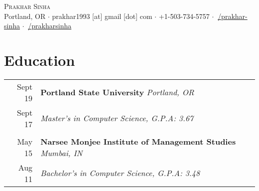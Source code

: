 \documentclass[article,10pt]{article}
\begin{document}
\pagestyle{empty} %

\begin{center}
	{\Huge \scshape {Prakhar Sinha}}\\
	Portland, OR $\cdot$ prakhar1993 [at] gmail [dot] com $\cdot$ +1-503-734-5757 $\cdot$ \href{https://linkedin.com/in/prakhar-sinha/}{\faLinkedinSquare $\:$/prakhar-sinha}  $\cdot$ \href{https://github.com/prakharsinha}{\faGithubSquare $\:$/prakharsinha}\\
\end{center}
 
\section{Education}
\begin{tabular}{r|p{16.75cm}}
 Sept \textquotesingle{}19 & \textbf{Portland State University} \emph{Portland, OR} \\ 
 Sept \textquotesingle{}17 & \emph{Master's in Computer Science, \textit{G.P.A: 3.67}}\\\multicolumn{2}{c}{} \\
 May \textquotesingle{}15 & \textbf{Narsee Monjee Institute of Management Studies} \emph{Mumbai, IN} \\
 Aug \textquotesingle{}11 & \emph{Bachelor's in Computer Science, \textit{G.P.A: 3.48}}\\%
\end{tabular}
\end{document}

